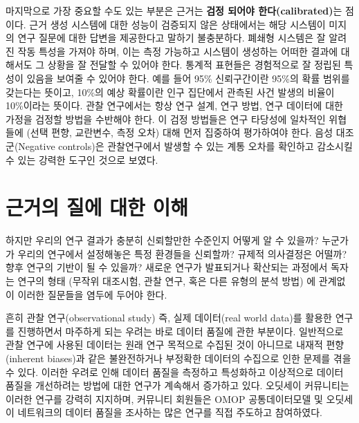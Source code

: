 \documentclass[11pt]{book}
\theoremstyle{definition}
\theoremstyle{definition}
\theoremstyle{definition}
\theoremstyle{remark}
\begin{document}
마지막으로 가장 중요할 수도 있는 부분은 근거는 \textbf{검정 되어야
한다(calibrated)}는 점이다. 근거 생성 시스템에 대한 성능이 검증되지 않은
상태에서는 해당 시스템이 미지의 연구 질문에 대한 답변을 제공한다고
말하기 불충분하다. 폐쇄형 시스템은 잘 알려진 작동 특성을 가져야 하며,
이는 측정 가능하고 시스템이 생성하는 어떠한 결과에 대해서도 그 상황을 잘
전달할 수 있어야 한다. 통계적 표현들은 경험적으로 잘 정립된 특성이
있음을 보여줄 수 있어야 한다. 예를 들어 95\% 신뢰구간이란 95\%의 확률
범위를 갖는다는 뜻이고, 10\%의 예상 확률이란 인구 집단에서 관측된 사건
발생의 비율이 10\%이라는 뜻이다. 관찰 연구에서는 항상 연구 설계, 연구
방법, 연구 데이터에 대한 가정을 검정할 방법을 수반해야 한다. 이 검정
방법들은 연구 타당성에 일차적인 위협들에 (선택 편향, 교란변수, 측정
오차) 대해 먼저 집중하여 평가하여야 한다. 음성 대조군(Negative
controls)은 관찰연구에서 발생할 수 있는 계통 오차를 확인하고 감소시킬 수
있는 강력한 도구인 것으로 보였다.
\citep{schuemie_2016, schuemie_2018, schuemie_2018b}

\section{근거의 질에 대한 이해}\label{---}

하지만 우리의 연구 결과가 충분히 신뢰할만한 수준인지 어떻게 알 수
있을까? 누군가가 우리의 연구에서 설정해놓은 특정 환경들을 신뢰할까?
규제적 의사결정은 어떨까? 향후 연구의 기반이 될 수 있을까? 새로운 연구가
발표되거나 확산되는 과정에서 독자는 연구의 형태 (무작위 대조시험, 관찰
연구, 혹은 다른 유형의 분석 방법) 에 관계없이 이러한 질문들을 염두에
두어야 한다.  

흔히 관찰 연구(observational study) 즉, 실제 데이터(real world data)를
활용한 연구를 진행하면서 마주하게 되는 우려는 바로 데이터 품질에 관한
부분이다. \citep{botsis2010secondary, hersh2013caveats, sherman2016real}
일반적으로 관찰 연구에 사용된 데이터는 원래 연구 목적으로 수집된 것이
아니므로 내재적 편향(inherent biases)과 같은 불완전하거나 부정확한
데이터의 수집으로 인한 문제를 겪을 수 있다. 이러한 우려로 인해 데이터
품질을 측정하고 특성화하고 이상적으로 데이터 품질을 개선하려는 방법에
대한 연구가 계속해서 증가하고 있다.
\citep{kahn2012pragmatic, liaw2013towards, weiskopf_2013} 오딧세이
커뮤니티는 이러한 연구를 강력히 지지하며, 커뮤니티 회원들은 OMOP
공통데이터모델 및 오딧세이 네트워크의 데이터 품질을 조사하는 많은 연구를
직접 주도하고 참여하였다.
\citep{huser_multisite_2016, kahn_transparent_2015, callahan2017comparison, yoon_2016}
 
\end{document}
